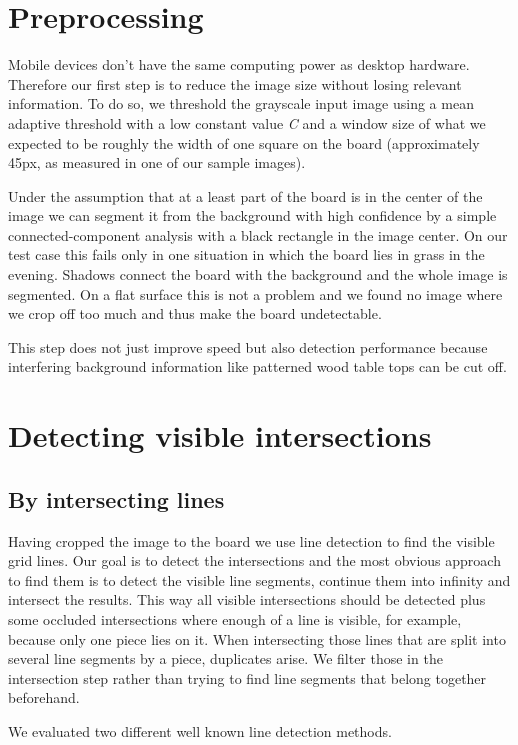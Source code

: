 	\section{Preprocessing}
	\label{detector-preprocessing}
	Mobile devices don't have the same computing power as desktop hardware. Therefore our first step is to reduce the image size without losing relevant information. To do so, we threshold the grayscale input image using a mean adaptive threshold with a low constant value \emph{C} and a window size of what we expected to be roughly the width of one square on the board (approximately 45px, as measured in one of our sample images).

	Under the assumption that at a least part of the board is in the center of the image we can segment it from the background with high confidence by a simple connected-component analysis with a black rectangle in the image center. On our test case this fails only in one situation in which the board lies in grass in the evening. Shadows connect the board with the background and the whole image is segmented. On a flat surface this is not a problem and we found no image where we crop off too much and thus make the board undetectable.

	This step does not just improve speed but also detection performance because interfering background information like patterned wood table tops can be cut off.

	\section{Detecting visible intersections}
	\subsection{By intersecting lines}
	Having cropped the image to the board we use line detection to find the visible grid lines. Our goal is to detect the intersections and the most obvious approach to find them is to detect the visible line segments, continue them into infinity and intersect the results. This way all visible intersections should be detected plus some occluded intersections where enough of a line is visible, for example, because only one piece lies on it. When intersecting those lines that are split into several line segments by a piece, duplicates arise. We filter those in the intersection step rather than trying to find line segments that belong together beforehand.

	We evaluated two different well known line detection methods.
